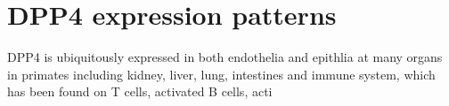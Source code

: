 \section{DPP4 expression patterns}
DPP4 is ubiquitously expressed in both endothelia and epithlia at many organs in primates including kidney, liver, lung, intestines and immune system, which has been found on T cells, activated B cells, acti